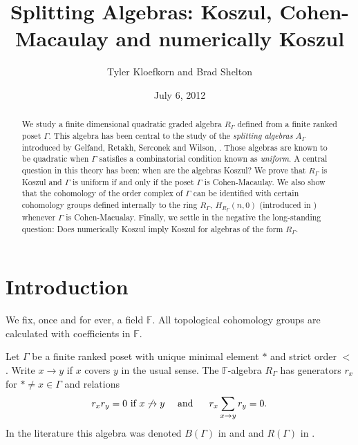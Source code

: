 \documentclass[11pt,righttag]{amsart}
\theoremstyle{definition}
\begin{document}
\title[Splitting Algebras]{Splitting Algebras: Koszul, Cohen-Macaulay and numerically Koszul}


\author[  Kloefkorn, Shelton ]{Tyler Kloefkorn and Brad Shelton}
\address{University of Oregon\\
Eugene, Oregon 97403}

\begin{abstract}
\baselineskip12pt
We study a finite dimensional quadratic graded algebra $R_\Gamma$ defined from a finite ranked poset $\Gamma$. This algebra has been central to the study of the {\it splitting algebras} $A_\Gamma$  introduced by Gelfand, Retakh, Serconek and Wilson, \cite{GRSW}. Those algebras are known to be quadratic when $\Gamma$ satisfies a combinatorial condition known as {\it uniform}.  A central question in this theory has been: when are the algebras Koszul?  We prove that  $R_\Gamma$ is Koszul and $\Gamma$ is uniform if and only if the poset $\Gamma$ is Cohen-Macaulay.  We also show that the cohomology of the order complex of $\Gamma$ can be identified with certain cohomology groups defined internally to the ring $R_\Gamma$, $H_{R_\Gamma}(n,0)$ (introduced in \cite{CPS}) whenever $\Gamma$ is Cohen-Macualay.  Finally, we settle in the negative the long-standing question: Does numerically Koszul imply Koszul for algebras of the form $R_\Gamma$.  
\end{abstract}
\date{July 6, 2012}

\maketitle

\baselineskip18pt

\section{Introduction}

We fix, once and for ever, a field ${{\mathbb F}}$.  All topological cohomology groups are calculated with coefficients in ${{\mathbb F}}$.  

Let $\Gamma$ be a finite ranked poset with unique minimal element $*$ and strict order $<$.  Write $x\to y$ if $x$ covers $y$ in the usual sense.  The ${{\mathbb F}}$-algebra $R_\Gamma$ has generators $r_x$ for $*\ne x\in \Gamma$ and relations
$$ r_xr_y=0 \hbox{ if } x \not \to y\quad  \hbox{\ and \ } \quad r_x\sum\limits_{x\to y} r_y=0.$$
In the literature this algebra was denoted $B(\Gamma)$ in \cite{RSW3} and \cite{RSW4} and $R(\Gamma)$ in \cite{CPS}.
\end{document}
